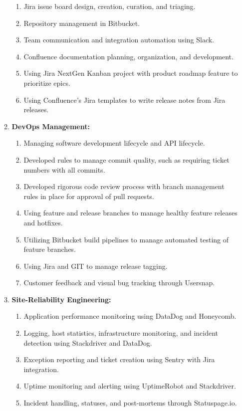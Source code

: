 \documentclass[oneside]{article}%
\begin{document}
\begin{enumerate}[]
\begin{enumerate}[]
\begin{enumerate}[-]
					\item Jira issue board design, creation, curation, and triaging.
					\item Repository management in Bitbucket.
					\item Team communication and integration automation using Slack.
					\item Confluence documentation planning, organization, and development.
					\item Using Jira NextGen Kanban project with product roadmap feature to prioritize epics.
					\item Using Confluence's Jira templates to write release notes from Jira releases.
				\end{enumerate}
			\item \textbf{DevOps Management:}
				\begin{enumerate}[-]
					\item Managing software development lifecycle and API lifecycle.
					\item Developed rules to manage commit quality, such as requiring ticket numbers with all commits.
					\item Developed rigorous code review process with branch management rules in place for approval of pull requests.
					\item Using feature and release branches to manage healthy feature releases and hotfixes.
					\item Utilizing Bitbucket build pipelines to manage automated testing of feature branches.
					\item Using Jira and GIT to manage release tagging.
					\item Customer feedback and visual bug tracking through Usersnap.
				\end{enumerate}
			\item \textbf{Site-Reliability Engineering:}
				\begin{enumerate}[-]
					\item Application performance monitoring using DataDog and Honeycomb.
					\item Logging, host statistics, infrastructure monitoring, and incident detection using Stackdriver and DataDog.
					\item Exception reporting and ticket creation using Sentry with Jira integration.
					\item Uptime monitoring and alerting using UptimeRobot and Stackdriver.
					\item Incident handling, statuses, and post-mortems through Statuspage.io.

\end{enumerate}
\end{enumerate}
\end{enumerate}
\end{document}
